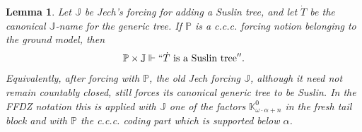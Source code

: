 \documentclass[11pt]{article}
\theoremstyle{plain}
\newtheorem{lemma}[theorem]{Lemma}
\theoremstyle{definition}
\theoremstyle{remark}
\newcommand{\Kk}{\mathbb K}
\begin{document}
\begin{lemma}\label{lem:jech-subtlety}
Let \(\mathbb J\) be Jech's forcing for adding a Suslin tree, and let
\(\dot T\) be the canonical \(\mathbb J\)-name for the generic tree.  If
\(\mathbb P\) is a c.c.c. forcing notion belonging to the ground model, then
\[
  \mathbb P\times\mathbb J\Vdash
  ``\dot T\text{ is a Suslin tree}''.
\]
Equivalently, after forcing with \(\mathbb P\), the old Jech forcing
\(\mathbb J\), although it need not remain countably closed, still forces its
canonical generic tree to be Suslin.  In the FFDZ notation this is applied with
\(\mathbb J\) one of the factors \(\Kk^0_{\omega\cdot\alpha+n}\) in the fresh
tail block and with \(\mathbb P\) the c.c.c. coding part which is supported below
\(\alpha\).
\end{lemma}
\end{document}
